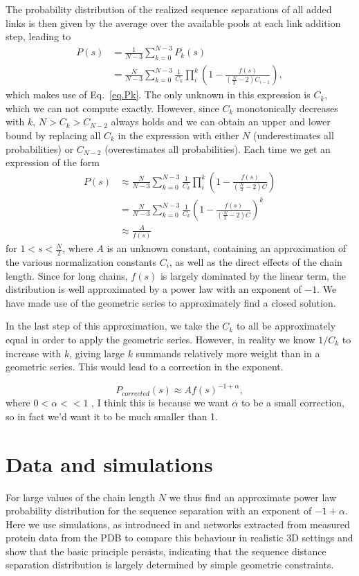 \documentclass[reprint,amsmath,amssymb,rmp,onecolumn,notitlepage,11pt]{revtex4-1}
\newcommand{\red}[1]{\textcolor{red!80!black}{#1}}
\begin{document}
The probability distribution of the realized sequence separations of all added links is then given by the average over the available pools at each link addition step, leading to
\begin{align}
    P(s)&=\frac{1}{N-3}\sum_{k=0}^{N-3} P_k(s) \nonumber \\
    &= \frac{N}{N-3}\sum_{k=0}^{N-3} \frac{1}{C_k}\prod_{i}^k\left(1-\frac{f(s)}{(\frac{N}{2}-2)C_{i-1}} \right),
\end{align}
which makes use of Eq.~\ref{eq.Pk}. The only unknown in this expression is $C_k$, which we can not compute exactly. However, since $C_k$ monotonically decreases with $k$, $N>C_k>C_{N-2}$ always holds and we can obtain an upper and lower bound by replacing all $C_k$ in the expression with either $N$ (underestimates all probabilities) or $C_{N-2}$ (overestimates all probabilities). Each time we get an expression of the form 
\begin{align}
     P(s)&\approx\frac{N}{N-3}\sum_{k=0}^{N-3} \frac{1}{C_k}\prod_{i}^k\left(1-\frac{f(s)}{(\frac{N}{2}-2)C} \right)\nonumber \\
     &=\frac{N}{N-3} \sum_{k=0}^{N-3}\frac{1}{C_k}\left(1-\frac{f(s)}{(\frac{N}{2}-2)C} \right)^k \nonumber \\
     &\approx \frac{A}{f(s)}
\end{align}
for $1<s<\frac{N}{2}$,
where $A$ is an unknown constant, containing an approximation of the various normalization constants $C_i$, as well as the direct effects of the chain length. 
Since for long chains, $f(s)$ is largely dominated by the linear term, the distribution is well approximated by a power law with an exponent of $-1$. We have made use of the geometric series to approximately find a closed solution. 

In the last step of this approximation, we take the $C_k$ to all be approximately equal in order to apply the geometric series. However, in reality we know $1/C_k$ to increase with $k$, giving large $k$ summands relatively more weight than in a geometric series. This would lead to a correction in the exponent.

\begin{equation}
    P_{corrected}(s)\approx A f(s)^{-1+\alpha},
\end{equation}
where $0<\alpha<<1$ \red{, I think this is because we want $\alpha$ to be a small correction, so in fact we'd want it to be much smaller than 1}.


\section*{Data and simulations}
 For large values of the chain length $N$ we thus find an approximate power law probability distribution for the sequence separation with an exponent of $-1+\alpha$. Here we use simulations, as introduced in \cite{molkenthin2020self} and networks extracted from measured protein data from the PDB \cite{PDB} to compare this behaviour in realistic 3D settings and show that the basic principle persists, indicating that the sequence distance separation distribution is largely determined by simple geometric constraints.
 
\end{document}
